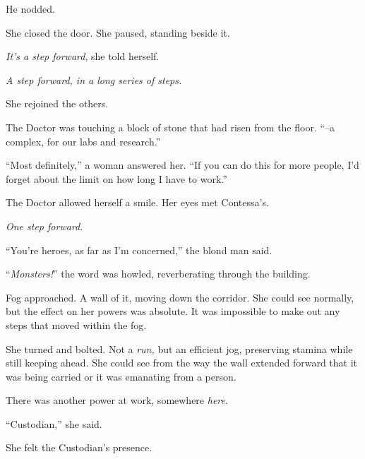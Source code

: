 He nodded.



She closed the door.  She paused, standing beside it.



\emph{It's a step forward}, she told herself.



\emph{A step forward, in a long series of steps.}



She rejoined the others.



The Doctor was touching a block of stone that had risen from the floor.  ``--a complex, for our labs and research.''



``Most definitely,'' a woman answered her.  ``If you can do this for more people, I'd forget about the limit on how long I have to work.''



The Doctor allowed herself a smile.  Her eyes met Contessa's.



\emph{One step forward}.



``You're heroes, as far as I'm concerned,'' the blond man said.



\sectionbreak



``\emph{Monsters!}'' the word was howled, reverberating through the building.



Fog approached.  A wall of it, moving down the corridor.  She could see normally, but the effect on her powers was absolute.  It was impossible to make out any steps that moved within the fog.



She turned and bolted.  Not a \emph{run,} but an efficient jog, preserving stamina while still keeping ahead.  She could see from the way the wall extended forward that it was being carried or it was emanating from a person.



There was another power at work, somewhere \emph{here}.



``Custodian,'' she said.



She felt the Custodian's presence.



